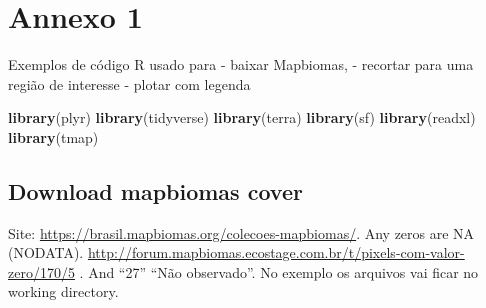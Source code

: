 \documentclass[
]{article}
\newenvironment{Shaded}{\begin{snugshade}}{\end{snugshade}}
\newcommand{\FunctionTok}[1]{\textcolor[rgb]{0.13,0.29,0.53}{\textbf{#1}}}
\newcommand{\NormalTok}[1]{#1}
\begin{document}
\newpage{}

\hypertarget{appendix-apuxeandice}{%
\appendix}


\hypertarget{annexo-1}{%
\section{Annexo 1}\label{annexo-1}}

Exemplos de código R usado para
- baixar Mapbiomas,
- recortar para uma região de interesse
- plotar com legenda

\begin{Shaded}
\begin{Highlighting}[]
\FunctionTok{library}\NormalTok{(plyr)}
\FunctionTok{library}\NormalTok{(tidyverse)}
\FunctionTok{library}\NormalTok{(terra)}
\FunctionTok{library}\NormalTok{(sf)}
\FunctionTok{library}\NormalTok{(readxl)}
\FunctionTok{library}\NormalTok{(tmap)}
\end{Highlighting}
\end{Shaded}

\hypertarget{download-mapbiomas-cover}{%
\subsection{Download mapbiomas cover}\label{download-mapbiomas-cover}}

Site: \url{https://brasil.mapbiomas.org/colecoes-mapbiomas/}.
Any zeros are NA (NODATA). \url{http://forum.mapbiomas.ecostage.com.br/t/pixels-com-valor-zero/170/5} .
And ``27'' ``Não observado''. No exemplo os arquivos vai ficar no working directory.
\end{document}
